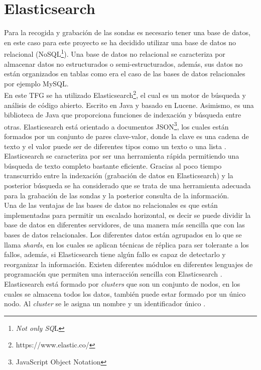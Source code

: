 \section{Elasticsearch}
Para la recogida y grabación de las sondas es necesario tener una base de datos, en este caso para este proyecto se ha decidido utilizar una base de datos no relacional (NoSQL\footnote{\textit{Not only SQ}L}). Una base de datos no relacional se caracteriza por almacenar datos no estructurados o semi-estructurados, además, sus datos no están organizados en tablas como era el caso de las bases de datos relacionales por ejemplo MySQL.\\

En este TFG se ha utilizado Elasticsearch\footnote{https://www.elastic.co/}, el cual es un motor de búsqueda y análisis de código abierto. Escrito en Java y basado en Lucene. Asimismo, es una biblioteca de Java que proporciona funciones de indexación y búsqueda entre otras. Elasticsearch está orientado a documentos JSON\footnote{JavaScript Object Notation}, los cuales están formados por un conjunto de pares clave-valor, donde la clave es una cadena de texto y el valor puede ser de diferentes tipos como un texto o una lista \cite{elastic}.\\

Elasticsearch se caracteriza por ser una herramienta rápida permitiendo una búsqueda de texto completo bastante eficiente. Gracias al poco tiempo transcurrido entre la indexación (grabación de datos en Elasticsearch) y la posterior búsqueda se ha considerado que se trata de una herramienta adecuada para la grabación de las sondas y la posterior consulta de la información.\\

Una de las ventajas de las bases de datos no relacionales es que están implementadas para permitir un escalado horizontal, es decir se puede dividir la base de datos en diferentes servidores, de una manera más sencilla que con las bases de datos relacionales. Los diferentes datos están agrupados en lo que se llama \textit{shards}, en los cuales se aplican técnicas de réplica para ser tolerante a los fallos, además, si Elasticsearch tiene algún fallo es capaz de detectarlo y reorganizar la información. Existen diferentes módulos en diferentes lenguajes de programación que permiten una interacción sencilla con Elasticsearch \cite{elastic2}.\\

Elasticsearch está formado por \textit{clusters} que son un conjunto de nodos, en los cuales se almacena todos los datos, también puede estar formado por un único nodo. Al \textit{cluster} se le asigna un nombre y un identificador único \cite{elastic3}.\\

